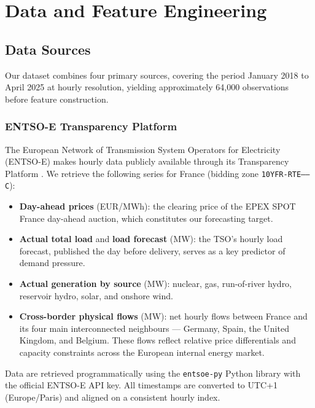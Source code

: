 \chapter{Data and Feature Engineering}
\label{chap:data}

\section{Data Sources}

Our dataset combines four primary sources, covering the period January 2018 to April 2025 at hourly resolution, yielding approximately 64,000 observations before feature construction.

\subsection{ENTSO-E Transparency Platform}

The European Network of Transmission System Operators for Electricity (ENTSO-E) makes hourly data publicly available through its Transparency Platform \citep{entsoe2024}. We retrieve the following series for France (bidding zone \texttt{10YFR-RTE------C}):

\begin{itemize}
  \item \textbf{Day-ahead prices} (EUR/MWh): the clearing price of the EPEX SPOT France day-ahead auction, which constitutes our forecasting target.
  \item \textbf{Actual total load} and \textbf{load forecast} (MW): the TSO's hourly load forecast, published the day before delivery, serves as a key predictor of demand pressure.
  \item \textbf{Actual generation by source} (MW): nuclear, gas, run-of-river hydro, reservoir hydro, solar, and onshore wind.
  \item \textbf{Cross-border physical flows} (MW): net hourly flows between France and its four main interconnected neighbours — Germany, Spain, the United Kingdom, and Belgium. These flows reflect relative price differentials and capacity constraints across the European internal energy market.
\end{itemize}

Data are retrieved programmatically using the \texttt{entsoe-py} Python library with the official ENTSO-E API key. All timestamps are converted to UTC+1 (Europe/Paris) and aligned on a consistent hourly index.

